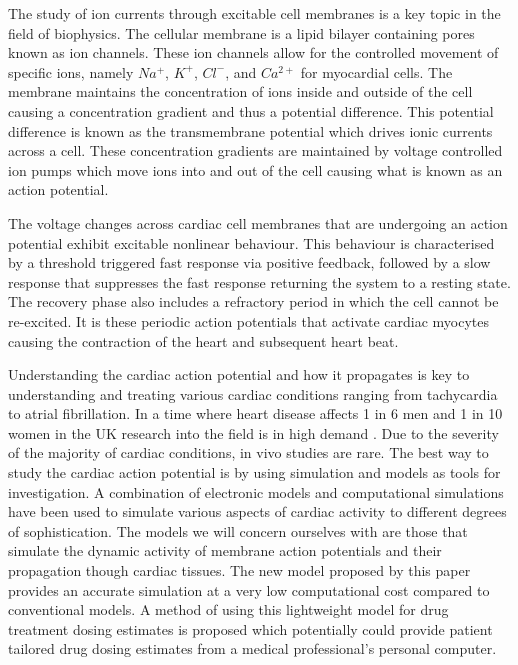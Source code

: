 The study of ion currents through excitable cell membranes is a key topic in the field of biophysics. The cellular membrane is a lipid bilayer containing pores known as ion channels. These ion channels allow for the controlled movement of specific ions, namely $Na^+$, $K^+$, $Cl^-$, and $Ca^{2+}$ for myocardial cells. The membrane maintains the concentration of ions inside and outside of the cell causing a concentration gradient and thus a potential difference. This potential difference is known as the transmembrane potential which drives ionic currents across a cell. These concentration gradients are maintained by voltage controlled ion pumps which move ions into and out of the cell causing what is known as an action potential. \par

The voltage changes across cardiac cell membranes that are undergoing an action potential exhibit excitable nonlinear behaviour. This behaviour is characterised by a threshold triggered fast response via positive feedback, followed by a slow response that suppresses the fast response returning the system to a resting state. The recovery phase also includes a refractory period in which the cell cannot be re-excited. It is these periodic action potentials that activate cardiac myocytes causing the contraction of the heart and subsequent heart beat.\par

Understanding the cardiac action potential and how it propagates is key to understanding and treating various cardiac conditions ranging from tachycardia to atrial fibrillation. In a time where heart disease affects 1 in 6 men and 1 in 10 women in the UK research into the field is in high demand \citep{diseaserate}. Due to the severity of the majority of cardiac conditions, in vivo studies are rare. The best way to study the cardiac action potential is by using simulation and models as tools for investigation. A combination of electronic models and computational simulations have been used to simulate various aspects of cardiac activity to different degrees of sophistication. The models we will concern ourselves with are those that simulate the dynamic activity of membrane action potentials and their propagation though cardiac tissues. The new model proposed by this paper provides an accurate simulation at a very low computational cost compared to conventional models. A method of using this lightweight model for drug treatment dosing estimates is proposed which potentially could provide patient tailored drug dosing estimates from a medical professional's personal computer.\par

